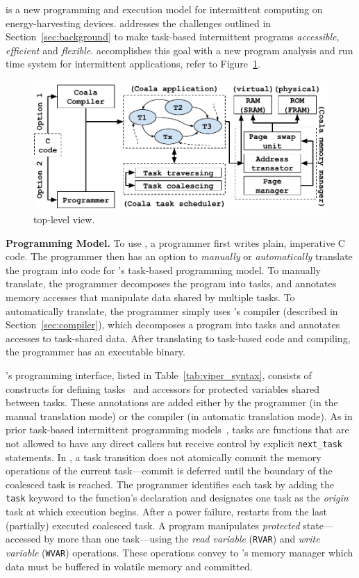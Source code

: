 \sys is a new programming and execution model for intermittent computing on
energy-harvesting devices. \sys addresses the challenges outlined in
Section~\ref{sec:background} to make task-based intermittent programs {\em
accessible}, {\em efficient} and {\em flexible}. \sys accomplishes this goal
with a new program analysis and run time system for intermittent applications,
refer to Figure~\ref{fig:system_overview}.

\begin{figure}
	\centering
	\includegraphics[width=\columnwidth]{figures/viper_block_diagram.pdf}
	\caption{\sys top-level view.}
	\label{fig:system_overview}
\end{figure}

\textbf{\sys Programming Model.} To use \sys, a programmer first writes plain, imperative C code. The programmer then has an option to {\em manually} or {\em automatically} translate the program into code for \sys's task-based programming model. To manually translate, the programmer decomposes the program into tasks, and annotates memory accesses that manipulate data shared by multiple tasks. To automatically translate, the programmer simply uses \sys's compiler (described in Section~\ref{sec:compiler}), which decomposes a program into tasks and annotates accesses to task-shared data. After translating to task-based code and compiling, the programmer has an executable \sys binary.

\sys's programming interface, listed in Table~\ref{tab:viper_syntax}, consists of
constructs for defining tasks~\cite{chain,alpaca} and accessors for
protected variables shared between tasks. These annotations are added either by
the programmer (in the manual translation mode) or the compiler (in automatic
translation mode). As in prior task-based intermittent programming
models~\cite{chain,alpaca}, tasks are functions that are not allowed to have
any direct callers but receive control by explicit {\tt next\_task} statements.
In \sys, a task transition does not atomically commit the memory operations of the current task---commit is deferred until the boundary of the coalesced task is reached. The programmer identifies each task by adding the {\tt task}
keyword to the function's declaration and designates one task as the {\em
origin} task at which execution begins. After a power failure,
\sys restarts from the last (partially) executed coalesced task.
%
A \sys program manipulates {\em protected} state---accessed by more than one
task---using the \emph{read variable} ({\tt RVAR}) and \emph{write variable}
({\tt WVAR}) operations. These operations convey to \sys's memory manager which
data must be buffered in volatile memory and committed.

